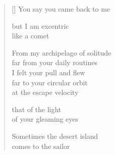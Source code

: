 \documentclass[11pt,a4paper]{article}
\begin{document}
\thispagestyle{empty}


\settowidth{\versewidth}{Sometimes the island comes to the sailor}

\bigskip

\begin{verse}[\versewidth]
  You say you came back to me

  but I am excentric \\
  like a comet

  From my archipelago of solitude \\
  far from your daily routines\\
  I felt your pull and flew\\
  far to your circular orbit\\
  at the escape velocity

  that of the light \\
  of your gleaming eyes

  Sometimes the desert island \\
  comes to the sailor
\end{verse}
\end{document}
